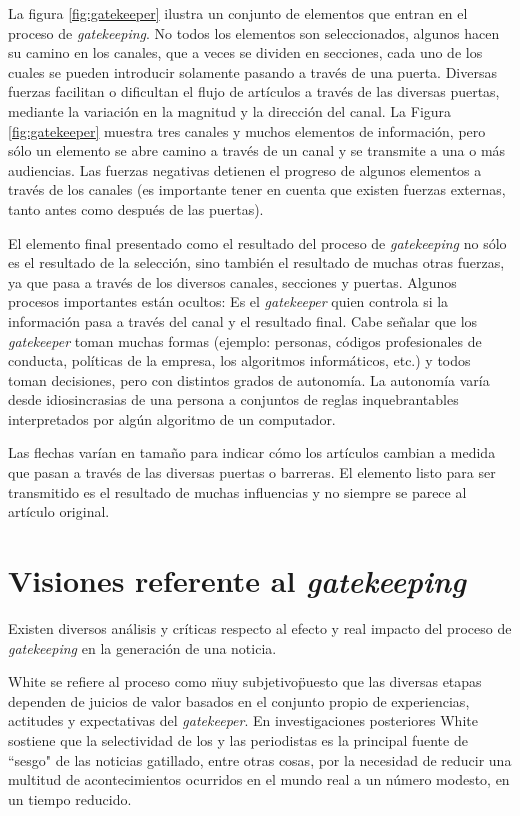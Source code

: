 La figura \ref{fig:gatekeeper} ilustra un conjunto de elementos que entran en el proceso de \emph{gatekeeping}. No todos los elementos son seleccionados, algunos hacen su camino en los canales, que a veces se dividen en secciones, cada uno de los cuales se pueden introducir solamente pasando a través de una puerta. Diversas fuerzas facilitan o dificultan el flujo de artículos a través de las diversas puertas, mediante la variación en la magnitud y la dirección del canal. La Figura \ref{fig:gatekeeper} muestra tres canales y muchos elementos de información, pero sólo un elemento se abre camino a través de un canal y se transmite a una o más audiencias. Las fuerzas negativas detienen el progreso de algunos elementos a través de los canales (es importante tener en cuenta que existen fuerzas externas, tanto antes como después de las puertas).

El elemento final presentado como el resultado del proceso de \emph{gatekeeping} no sólo es el resultado de la selección, sino también el resultado de muchas otras fuerzas, ya que pasa a través de los diversos canales, secciones y puertas. Algunos procesos importantes están ocultos: Es el \emph{gatekeeper} quien controla si la información pasa a través del canal y el resultado final. Cabe señalar que los \emph{gatekeeper} toman muchas formas (ejemplo: personas, códigos profesionales de conducta, políticas de la empresa, los algoritmos informáticos, etc.) y todos toman decisiones, pero con distintos grados de autonomía. La autonomía varía desde idiosincrasias de una persona a conjuntos de reglas inquebrantables interpretados por algún algoritmo de un computador.

Las flechas varían en tamaño para indicar cómo los artículos cambian a medida que pasan a través de las diversas puertas o barreras. El elemento listo para ser transmitido es el resultado de muchas influencias y no siempre se parece al artículo original.

\section{Visiones referente al \emph{gatekeeping}}

Existen diversos análisis y críticas respecto al efecto y real impacto del proceso de \emph{gatekeeping} en la generación de una noticia.

White\cite{white} se refiere al proceso como \"muy subjetivo\" puesto que las diversas etapas dependen de juicios de valor basados en el conjunto propio de experiencias, actitudes y expectativas del \emph{gatekeeper}. En investigaciones posteriores White sostiene que la selectividad de los y las periodistas es la principal fuente de ``sesgo" de las noticias gatillado, entre otras cosas, por la necesidad de reducir una multitud de acontecimientos ocurridos en el mundo real a un número modesto, en un tiempo reducido. 


